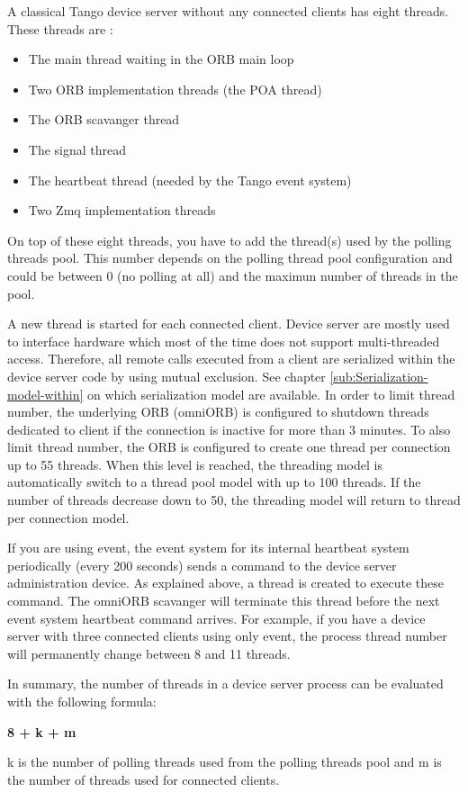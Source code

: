 A classical Tango device server without any connected clients has
eight threads. These threads are :
\begin{itemize}
\item The main thread waiting in the ORB main loop
\item Two ORB implementation threads (the POA thread)
\item The ORB scavanger thread
\item The signal thread
\item The heartbeat thread (needed by the Tango event system)
\item Two Zmq implementation threads
\end{itemize}
On top of these eight threads, you have to add the thread(s) used
by the polling threads pool. This number depends on the polling thread
pool configuration and could be between 0 (no polling at all) and
the maximun number of threads in the pool.

A new thread is started for each connected client. Device server are
mostly used to interface hardware which most of the time does not
support multi-threaded access. Therefore, all remote calls executed
from a client are serialized within the device server code by using
mutual exclusion. See chapter \ref{sub:Serialization-model-within}
on which serialization model are available. In order to limit thread
number, the underlying ORB (omniORB) is configured to shutdown threads
dedicated to client if the connection is inactive for more than 3
minutes. To also limit thread number, the ORB is configured to create
one thread per connection up to 55 threads. When this level is reached,
the threading model is automatically switch to a \textquotedbl{}thread
pool\textquotedbl{} model with up to 100 threads. If the number of
threads decrease down to 50, the threading model will return to \textquotedbl{}thread
per connection\textquotedbl{} model.

If you are using event, the event system for its internal heartbeat
system periodically (every 200 seconds) sends a command to the device
server administration device. As explained above, a thread is created
to execute these command. The omniORB scavanger will terminate this
thread before the next event system heartbeat command arrives. For
example, if you have a device server with three connected clients
using only event, the process thread number will permanently change
between 8 and 11 threads.

In summary, the number of threads in a device server process can be
evaluated with the following formula:\begin{center}\textbf{8 + k
+ m}\end{center}k is the number of polling threads used from the
polling threads pool and m is the number of threads used for connected
clients.


